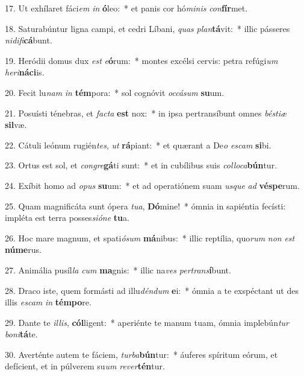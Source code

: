 17. Ut exhílaret fáci\textit{em} \textit{in} \textbf{ó}leo:~*  et panis cor hó\textit{mi}\textit{nis} \textit{con}\textbf{fír}met.\

18. Saturabúntur ligna campi, et cedri Líbani, \textit{quas} \textit{plan}\textbf{tá}vit:~*  illic pásseres \textit{ni}\textit{di}\textit{fi}\textbf{cá}bunt.\

19. Heródii domus dux \textit{est} \textit{e}\textbf{ó}rum:~*  montes excélsi cervis: petra refúgi\textit{um} \textit{he}\textit{ri}\textbf{ná}\textbf{ci}is.\

20. Fecit lu\textit{nam} \textit{in} \textbf{tém}pora:~*  sol cognóvit \textit{oc}\textit{cá}\textit{sum} \textbf{su}um.\

21. Posuísti ténebras, et \textit{fac}\textit{ta} \textbf{est} nox:~*  in ipsa pertransíbunt omnes \textit{bés}\textit{ti}\textit{æ} \textbf{sil}væ.\

22. Cátuli leónum rugién\textit{tes}, \textit{ut} \textbf{rá}piant:~*  et quærant a De\textit{o} \textit{es}\textit{cam} \textbf{si}bi.\

23. Ortus est sol, et \textit{con}\textit{gre}\textbf{gá}ti sunt:~*  et in cubílibus suis \textit{col}\textit{lo}\textit{ca}\textbf{bún}tur.\

24. Exíbit homo ad \textit{o}\textit{pus} \textbf{su}um:~*  et ad operatiónem suam \textit{us}\textit{que} \textit{ad} \textbf{vés}\textbf{pe}rum.\

25. Quam magnificáta sunt ópera \textit{tu}\textit{a}, \textbf{Dó}mine!~*  ómnia in sapiéntia fecísti: impléta est terra posses\textit{si}\textit{ó}\textit{ne} \textbf{tu}a.\

26. Hoc mare magnum, et spati\textit{ó}\textit{sum} \textbf{má}nibus:~*  illic reptília, quo\textit{rum} \textit{non} \textit{est} \textbf{nú}\textbf{me}rus.\

27. Animália pusíl\textit{la} \textit{cum} \textbf{ma}gnis:~*  illic na\textit{ves} \textit{per}\textit{trans}\textbf{í}bunt.\

28. Draco iste, quem formásti ad illu\textit{dén}\textit{dum} \textbf{e}i:~*  ómnia a te exspéctant ut des illis \textit{es}\textit{cam} \textit{in} \textbf{tém}\textbf{po}re.\

29. Dante te \textit{il}\textit{lis}, \textbf{cól}ligent:~*  aperiénte te manum tuam, ómnia implebún\textit{tur} \textit{bo}\textit{ni}\textbf{tá}te.\

30. Averténte autem te fáciem, \textit{tur}\textit{ba}\textbf{bún}tur:~*  áuferes spíritum eórum, et defícient, et in púlverem su\textit{um} \textit{re}\textit{ver}\textbf{tén}tur.\

